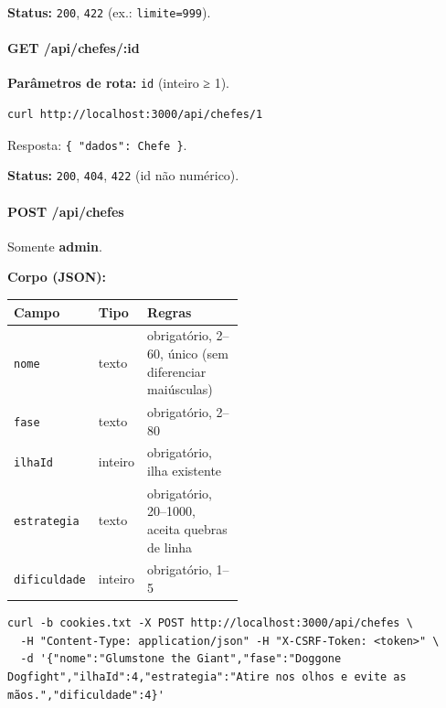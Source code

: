 \textbf{Status:} \texttt{200}, \texttt{422} (ex.: \texttt{limite=999}).

\hypertarget{get-apichefesid}{%
\paragraph{GET /api/chefes/:id}\label{get-apichefesid}}

\textbf{Parâmetros de rota:} \texttt{id} (inteiro ≥ 1).

\begin{Verbatim}[breaklines,breakanywhere,fontsize=\scriptsize]
curl http://localhost:3000/api/chefes/1
\end{Verbatim}

Resposta: \texttt{\{\ "dados":\ Chefe\ \}}.

\textbf{Status:} \texttt{200}, \texttt{404}, \texttt{422} (id não
numérico).

\hypertarget{post-apichefes}{%
\paragraph{POST /api/chefes}\label{post-apichefes}}

Somente \textbf{admin}.

\textbf{Corpo (JSON):}

\begin{longtable}[]{@{}llp{0.5\linewidth}@{}}
\toprule\noalign{}
Campo & Tipo & Regras \\
\midrule\noalign{}
\endhead
\bottomrule\noalign{}
\endlastfoot
\texttt{nome} & texto & obrigatório, 2--60, único (sem diferenciar
maiúsculas) \\
\texttt{fase} & texto & obrigatório, 2--80 \\
\texttt{ilhaId} & inteiro & obrigatório, ilha existente \\
\texttt{estrategia} & texto & obrigatório, 20--1000, aceita quebras de
linha \\
\texttt{dificuldade} & inteiro & obrigatório, 1--5 \\
\end{longtable}

\begin{Verbatim}[breaklines,breakanywhere,fontsize=\scriptsize]
curl -b cookies.txt -X POST http://localhost:3000/api/chefes \
  -H "Content-Type: application/json" -H "X-CSRF-Token: <token>" \
  -d '{"nome":"Glumstone the Giant","fase":"Doggone Dogfight","ilhaId":4,"estrategia":"Atire nos olhos e evite as mãos.","dificuldade":4}'
\end{Verbatim}

